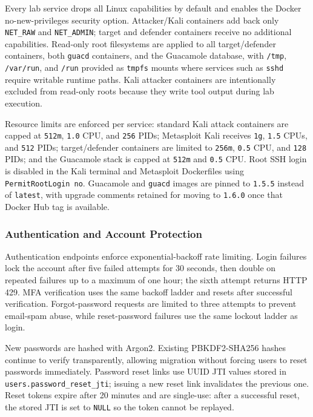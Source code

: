 \documentclass[12pt,a4paper]{report}
\begin{document}
Every lab service drops all Linux capabilities by default and enables the Docker no-new-privileges security option. Attacker/Kali containers add back only \texttt{NET\_RAW} and \texttt{NET\_ADMIN}; target and defender containers receive no additional capabilities. Read-only root filesystems are applied to all target/defender containers, both \texttt{guacd} containers, and the Guacamole database, with \texttt{/tmp}, \texttt{/var/run}, and \texttt{/run} provided as \texttt{tmpfs} mounts where services such as \texttt{sshd} require writable runtime paths. Kali attacker containers are intentionally excluded from read-only roots because they write tool output during lab execution.

Resource limits are enforced per service: standard Kali attack containers are capped at \texttt{512m}, \texttt{1.0} CPU, and \texttt{256} PIDs; Metasploit Kali receives \texttt{1g}, \texttt{1.5} CPUs, and \texttt{512} PIDs; target/defender containers are limited to \texttt{256m}, \texttt{0.5} CPU, and \texttt{128} PIDs; and the Guacamole stack is capped at \texttt{512m} and \texttt{0.5} CPU. Root SSH login is disabled in the Kali terminal and Metasploit Dockerfiles using \texttt{PermitRootLogin no}. Guacamole and \texttt{guacd} images are pinned to \texttt{1.5.5} instead of \texttt{latest}, with upgrade comments retained for moving to \texttt{1.6.0} once that Docker Hub tag is available.

\subsubsection{Authentication and Account Protection}

Authentication endpoints enforce exponential-backoff rate limiting. Login failures lock the account after five failed attempts for 30 seconds, then double on repeated failures up to a maximum of one hour; the sixth attempt returns HTTP 429. MFA verification uses the same backoff ladder and resets after successful verification. Forgot-password requests are limited to three attempts to prevent email-spam abuse, while reset-password failures use the same lockout ladder as login.

New passwords are hashed with Argon2. Existing PBKDF2-SHA256 hashes continue to verify transparently, allowing migration without forcing users to reset passwords immediately. Password reset links use UUID JTI values stored in \texttt{users.password\_reset\_jti}; issuing a new reset link invalidates the previous one. Reset tokens expire after 20 minutes and are single-use: after a successful reset, the stored JTI is set to \texttt{NULL} so the token cannot be replayed.
\end{document}
